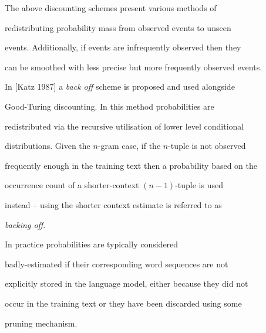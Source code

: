 















\label{smoothing_probs}


The above discounting schemes present various methods of


redistributing probability mass from observed events to unseen


events. Additionally, if events are infrequently observed then they


can be smoothed with less precise but more frequently observed events.





In [Katz 1987] a {\it back off} scheme is proposed and used alongside


Good-Turing discounting. In this method probabilities are


redistributed via the recursive utilisation of lower level conditional


distributions. Given the $n$-gram case, if the $n$-tuple is not observed


frequently enough in the training text then a probability based on the


occurrence count of a shorter-context $(n-1)$-tuple is used


instead -- using the shorter context estimate is referred to as


{\it backing off}.


In practice probabilities are typically considered


badly-estimated if their corresponding word sequences are not


explicitly stored in the language model, either because they did not


occur in the training text or they have been discarded using some


pruning mechanism.





